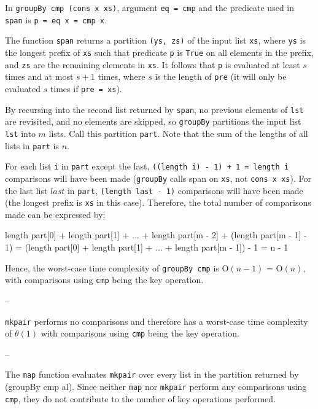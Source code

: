 \documentclass[../main.tex]{subfiles}
\begin{document}
In \texttt{groupBy cmp (cons x xs)}, argument \texttt{eq = cmp} and the predicate used in \texttt{span} is \texttt{p = eq x = cmp x}.

The function \texttt{span} returns a partition \texttt{(ys, zs)} of the input list \texttt{xs}, where \texttt{ys} is the longest prefix of \texttt{xs} such that predicate \texttt{p} is \texttt{True} on all elements in the prefix, and \texttt{zs} are the remaining elements in \texttt{xs}.  It follows that \texttt{p} is evaluated at least $s$ times and at most $s + 1$ times, where $s$ is the length of \texttt{pre} (it will only be evaluated $s$ times if \texttt{pre = xs}).

By recursing into the second list returned by \texttt{span}, no previous elements of \texttt{lst} are revisited, and no elements are skipped, so \texttt{groupBy} partitions the input list \texttt{lst} into $m$ lists.  Call this partition \texttt{part}.  Note that the sum of the lengths of all lists in \texttt{part} is $n$.

For each list \texttt{i} in \texttt{part} except the last, \texttt{((length i) - 1) + 1 = length i} comparisons will have been made (\texttt{groupBy} calls span on \texttt{xs}, not \texttt{cons x xs}).  For the last list $last$ in \texttt{part}, \texttt{(length last - 1)} comparisons will have been made (the longest prefix is \texttt{xs} in this case).  Therefore, the total number of comparisons made can be expressed by:

\begin{code}
length part[0] + length part[1] + ... + length part[m - 2]
  + (length part[m - 1] - 1)
= (length part[0] + length part[1] + ... + length part[m - 1]) - 1
= n - 1
\end{code}

Hence, the worst-case time complexity of \texttt{groupBy cmp} is O$(n - 1)$ = O$(n)$, with comparisons using \texttt{cmp} being the key operation.
\qedsymbol

--

\texttt{mkpair} performs no comparisons and therefore has a worst-case time complexity of
$\theta(1)$ with comparisons using \texttt{cmp} being the key operation.

--

The \texttt{map} function evaluates \texttt{mkpair} over every list in the partition returned by (groupBy cmp al).  Since
neither \texttt{map} nor \texttt{mkpair} perform any comparisons using \texttt{cmp}, they do not contribute to the number
of key operations performed.
\end{document}
